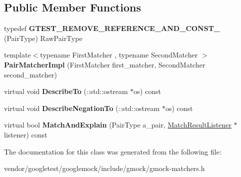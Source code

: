 \subsection*{Public Member Functions}
\begin{DoxyCompactItemize}
\item 
typedef {\bfseries G\+T\+E\+S\+T\+\_\+\+R\+E\+M\+O\+V\+E\+\_\+\+R\+E\+F\+E\+R\+E\+N\+C\+E\+\_\+\+A\+N\+D\+\_\+\+C\+O\+N\+S\+T\+\_\+} (Pair\+Type) Raw\+Pair\+Type\hypertarget{classtesting_1_1internal_1_1PairMatcherImpl_aa035224a7b73b2af1d1d27226a479241}{}\label{classtesting_1_1internal_1_1PairMatcherImpl_aa035224a7b73b2af1d1d27226a479241}

\item 
{\footnotesize template$<$typename First\+Matcher , typename Second\+Matcher $>$ }\\{\bfseries Pair\+Matcher\+Impl} (First\+Matcher first\+\_\+matcher, Second\+Matcher second\+\_\+matcher)\hypertarget{classtesting_1_1internal_1_1PairMatcherImpl_ae2615e785df46255c8695a5972ca510a}{}\label{classtesting_1_1internal_1_1PairMatcherImpl_ae2615e785df46255c8695a5972ca510a}

\item 
virtual void {\bfseries Describe\+To} (\+::std\+::ostream $\ast$os) const \hypertarget{classtesting_1_1internal_1_1PairMatcherImpl_a901ef35fe2284f9c0decf41af8143dd2}{}\label{classtesting_1_1internal_1_1PairMatcherImpl_a901ef35fe2284f9c0decf41af8143dd2}

\item 
virtual void {\bfseries Describe\+Negation\+To} (\+::std\+::ostream $\ast$os) const \hypertarget{classtesting_1_1internal_1_1PairMatcherImpl_a922aa4076ef4e2f1a2d2b4ae30d8be7c}{}\label{classtesting_1_1internal_1_1PairMatcherImpl_a922aa4076ef4e2f1a2d2b4ae30d8be7c}

\item 
virtual bool {\bfseries Match\+And\+Explain} (Pair\+Type a\+\_\+pair, \hyperlink{classtesting_1_1MatchResultListener}{Match\+Result\+Listener} $\ast$listener) const \hypertarget{classtesting_1_1internal_1_1PairMatcherImpl_a691add64a7dd061451722cdf95a6eba2}{}\label{classtesting_1_1internal_1_1PairMatcherImpl_a691add64a7dd061451722cdf95a6eba2}

\end{DoxyCompactItemize}


The documentation for this class was generated from the following file\+:\begin{DoxyCompactItemize}
\item 
vendor/googletest/googlemock/include/gmock/gmock-\/matchers.\+h\end{DoxyCompactItemize}
